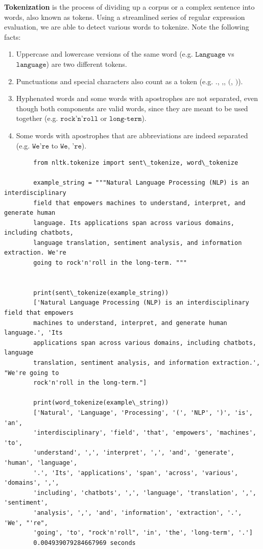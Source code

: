 \documentclass{article}
\begin{document}
      \textbf{Tokenization} is the process of dividing up a corpus or a complex sentence into words, also known as tokens. Using a streamlined series of regular expression evaluation, we are able to detect various words to tokenize. Note the following facts: 
      \begin{enumerate}
        \item Uppercase and lowercase versions of the same word (e.g. $\texttt{Language}$ vs $\texttt{language}$) are two different tokens. 
        \item Punctuations and special characters also count as a token (e.g. $\texttt{.}$, $\texttt{,}$, $\texttt{(}$, $\texttt{)}$). 
        \item Hyphenated words and some words with apostrophes are not separated, even though both components are valid words, since they are meant to be used together (e.g. $\texttt{rock'n'roll}$ or $\texttt{long-term}$). 
        \item Some words with apostrophes that are abbreviations are indeed separated (e.g. $\texttt{We're}$ to $\texttt{We}$, $\texttt{'re}$). 
      \end{enumerate}

      \begin{lstlisting}
        from nltk.tokenize import sent\_tokenize, word\_tokenize 

        example_string = """Natural Language Processing (NLP) is an interdisciplinary 
        field that empowers machines to understand, interpret, and generate human 
        language. Its applications span across various domains, including chatbots, 
        language translation, sentiment analysis, and information extraction. We're 
        going to rock'n'roll in the long-term. """


        print(sent\_tokenize(example_string))
        ['Natural Language Processing (NLP) is an interdisciplinary field that empowers 
        machines to understand, interpret, and generate human language.', 'Its 
        applications span across various domains, including chatbots, language 
        translation, sentiment analysis, and information extraction.', "We're going to 
        rock'n'roll in the long-term."]

        print(word_tokenize(example\_string))
        ['Natural', 'Language', 'Processing', '(', 'NLP', ')', 'is', 'an', 
        'interdisciplinary', 'field', 'that', 'empowers', 'machines', 'to', 
        'understand', ',', 'interpret', ',', 'and', 'generate', 'human', 'language', 
        '.', 'Its', 'applications', 'span', 'across', 'various', 'domains', ',', 
        'including', 'chatbots', ',', 'language', 'translation', ',', 'sentiment', 
        'analysis', ',', 'and', 'information', 'extraction', '.', 'We', "'re", 
        'going', 'to', "rock'n'roll", 'in', 'the', 'long-term', '.']
        0.004939079284667969 seconds 
      \end{lstlisting}
\end{document}
